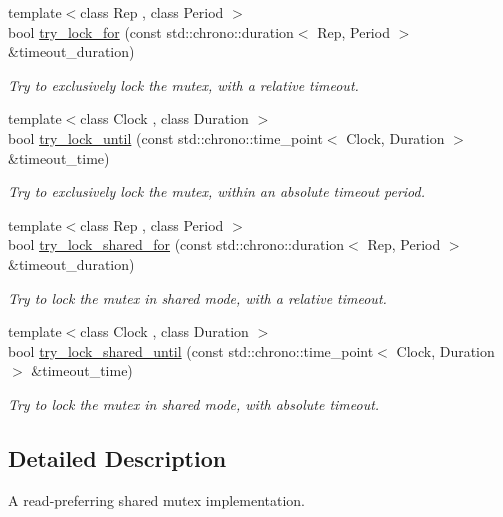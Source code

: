 \begin{DoxyCompactItemize}
{\footnotesize template$<$class Rep , class Period $>$ }\\bool \hyperlink{classcpen333_1_1thread_1_1impl_1_1shared__mutex__shared_a354b81f50045cbb68a8bb295222e4b5b}{try\+\_\+lock\+\_\+for} (const std\+::chrono\+::duration$<$ Rep, Period $>$ \&timeout\+\_\+duration)
\begin{DoxyCompactList}\small\item\em Try to exclusively lock the mutex, with a relative timeout. \end{DoxyCompactList}\item 
{\footnotesize template$<$class Clock , class Duration $>$ }\\bool \hyperlink{classcpen333_1_1thread_1_1impl_1_1shared__mutex__shared_a58baad110b6dfb6bc036a46f846f9f00}{try\+\_\+lock\+\_\+until} (const std\+::chrono\+::time\+\_\+point$<$ Clock, Duration $>$ \&timeout\+\_\+time)
\begin{DoxyCompactList}\small\item\em Try to exclusively lock the mutex, within an absolute timeout period. \end{DoxyCompactList}\item 
{\footnotesize template$<$class Rep , class Period $>$ }\\bool \hyperlink{classcpen333_1_1thread_1_1impl_1_1shared__mutex__shared_a12d65f5e71f62d44ca910a1bf8831f13}{try\+\_\+lock\+\_\+shared\+\_\+for} (const std\+::chrono\+::duration$<$ Rep, Period $>$ \&timeout\+\_\+duration)
\begin{DoxyCompactList}\small\item\em Try to lock the mutex in shared mode, with a relative timeout. \end{DoxyCompactList}\item 
{\footnotesize template$<$class Clock , class Duration $>$ }\\bool \hyperlink{classcpen333_1_1thread_1_1impl_1_1shared__mutex__shared_a2e55208ed6d24f5ff3112998ff2f50c5}{try\+\_\+lock\+\_\+shared\+\_\+until} (const std\+::chrono\+::time\+\_\+point$<$ Clock, Duration $>$ \&timeout\+\_\+time)
\begin{DoxyCompactList}\small\item\em Try to lock the mutex in shared mode, with absolute timeout. \end{DoxyCompactList}\end{DoxyCompactItemize}


\subsection{Detailed Description}
A read-\/preferring shared mutex implementation. 

